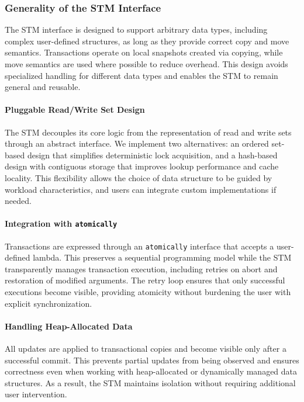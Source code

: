 \documentclass[11pt,a4paper]{article}
\begin{document}
\subsubsection{Generality of the STM Interface}

The STM interface is designed to support arbitrary data types, including complex user-defined structures, as long as they provide correct copy and move semantics. Transactions operate on local snapshots created via copying, while move semantics are used where possible to reduce overhead. This design avoids specialized handling for different data types and enables the STM to remain general and reusable.

\paragraph{Pluggable Read/Write Set Design}

The STM decouples its core logic from the representation of read and write sets through an abstract interface. We implement two alternatives: an ordered set-based design that simplifies deterministic lock acquisition, and a hash-based design with contiguous storage that improves lookup performance and cache locality. This flexibility allows the choice of data structure to be guided by workload characteristics, and users can integrate custom implementations if needed.

\paragraph{Integration with \texttt{atomically}}

Transactions are expressed through an \texttt{atomically} interface that accepts a user-defined lambda. This preserves a sequential programming model while the STM transparently manages transaction execution, including retries on abort and restoration of modified arguments. The retry loop ensures that only successful executions become visible, providing atomicity without burdening the user with explicit synchronization.

\paragraph{Handling Heap-Allocated Data}

All updates are applied to transactional copies and become visible only after a successful commit. This prevents partial updates from being observed and ensures correctness even when working with heap-allocated or dynamically managed data structures. As a result, the STM maintains isolation without requiring additional user intervention.
\end{document}
